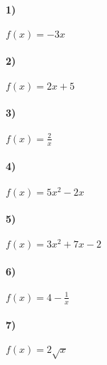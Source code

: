 \documentclass[a4paper]{article}
\begin{document}
  \paragraph{1)}
  $f(x) = - 3 x$
  \paragraph{2)}
  $f(x) = 2x + 5$
  \paragraph{3)}
  $\displaystyle f(x) = \frac{2}{x}$
  \paragraph{4)}
  $f(x) = 5 x^2 - 2x$
  \paragraph{5)}
  $f(x) = 3 x^2 + 7x - 2$
  \paragraph{6)}
  $\displaystyle f(x) = 4 - \frac{1}{x}$
  \paragraph{7)}
  $f(x) = 2 \sqrt{x}$
\end{document}

